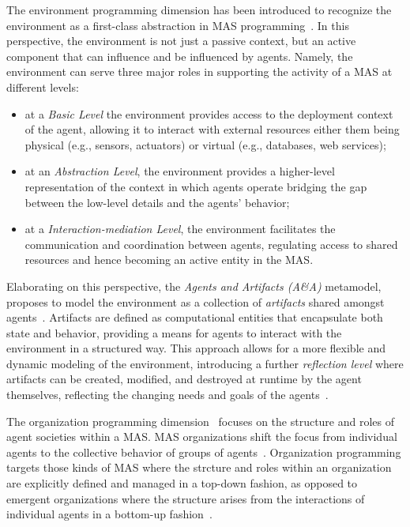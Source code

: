 The environment programming dimension has been introduced to recognize the environment as a first-class abstraction in \ac{MAS} programming~\cite{Weyns_Omicini_Odell_2007}.
%
In this perspective, the environment is not just a passive context, but an active component that can influence and be influenced by agents.
%
Namely, the environment can serve three major roles in supporting the activity of a \ac{MAS} at different levels: 
\begin{itemize}
    \item at a \emph{Basic Level} the environment provides access to the deployment context of the agent, allowing it to interact with external resources either them being physical (e.g., sensors, actuators) or virtual (e.g., databases, web services);
    \item at an \emph{Abstraction Level}, the environment provides a higher-level representation of the context in which agents operate bridging the gap between the low-level details and the agents' behavior;
    \item at a \emph{Interaction-mediation Level}, the environment facilitates the communication and coordination between agents, regulating access to shared resources and hence becoming an active entity in the \ac{MAS}.
\end{itemize}


Elaborating on this perspective, the \emph{Agents and Artifacts (A\&A)} metamodel, proposes to model the environment as a collection of \emph{artifacts} shared amongst agents~\cite{Omicini_Ricci_Viroli_2008}.
%
Artifacts are defined as computational entities that encapsulate both state and behavior, providing a means for agents to interact with the environment in a structured way.
%
This approach allows for a more flexible and dynamic modeling of the environment, introducing a further \emph{reflection level} where artifacts can be created, modified, and destroyed at runtime by the agent themselves, reflecting the changing needs and goals of the agents~\cite{Ricci_Omicini_Viroli_Gardelli_Oliva_2007}.

The organization programming dimension~\cite{Boissier_Hübner_Sichman_2007} focuses on the structure and roles of agent societies within a \ac{MAS}. 
%
\ac{MAS} organizations shift the focus from individual agents to the collective behavior of groups of agents~\cite{Ferber_Gutknecht_Michel_2004}.
%
Organization programming targets those kinds of \ac{MAS} where the strcture and roles within an organization are explicitly defined and managed in a top-down fashion, as opposed to emergent organizations where the structure arises from the interactions of individual agents in a bottom-up fashion~\cite{Boissier_Hübner_Sichman_2007}.

